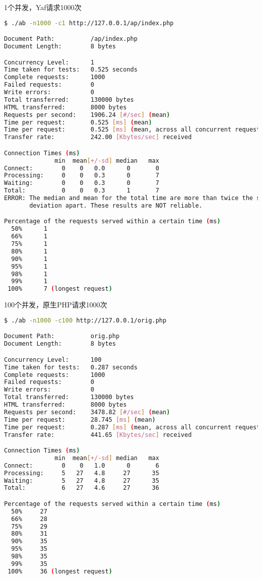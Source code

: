\begin{example}
1个并发，Yaf请求1000次
\begin{lstlisting}[language=bash]
$ ./ab -n1000 -c1 http://127.0.0.1/ap/index.php

Document Path:          /ap/index.php
Document Length:        8 bytes

Concurrency Level:      1
Time taken for tests:   0.525 seconds
Complete requests:      1000
Failed requests:        0
Write errors:           0
Total transferred:      130000 bytes
HTML transferred:       8000 bytes
Requests per second:    1906.24 [#/sec] (mean)
Time per request:       0.525 [ms] (mean)
Time per request:       0.525 [ms] (mean, across all concurrent requests)
Transfer rate:          242.00 [Kbytes/sec] received

Connection Times (ms)
              min  mean[+/-sd] median   max
Connect:        0    0   0.0      0       0
Processing:     0    0   0.3      0       7
Waiting:        0    0   0.3      0       7
Total:          0    0   0.3      1       7
ERROR: The median and mean for the total time are more than twice the standard
       deviation apart. These results are NOT reliable.

Percentage of the requests served within a certain time (ms)
  50%      1
  66%      1
  75%      1
  80%      1
  90%      1
  95%      1
  98%      1
  99%      1
 100%      7 (longest request)
\end{lstlisting}
\end{example}



\begin{example}
100个并发，原生PHP请求1000次
\begin{lstlisting}[language=bash]
$ ./ab -n1000 -c100 http://127.0.0.1/orig.php

Document Path:          orig.php
Document Length:        8 bytes

Concurrency Level:      100
Time taken for tests:   0.287 seconds
Complete requests:      1000
Failed requests:        0
Write errors:           0
Total transferred:      130000 bytes
HTML transferred:       8000 bytes
Requests per second:    3478.82 [#/sec] (mean)
Time per request:       28.745 [ms] (mean)
Time per request:       0.287 [ms] (mean, across all concurrent requests)
Transfer rate:          441.65 [Kbytes/sec] received

Connection Times (ms)
              min  mean[+/-sd] median   max
Connect:        0    0   1.0      0       6
Processing:     5   27   4.8     27      35
Waiting:        5   27   4.8     27      35
Total:          6   27   4.6     27      36

Percentage of the requests served within a certain time (ms)
  50%     27
  66%     28
  75%     29
  80%     31
  90%     35
  95%     35
  98%     35
  99%     35
 100%     36 (longest request)
\end{lstlisting}
\end{example}



